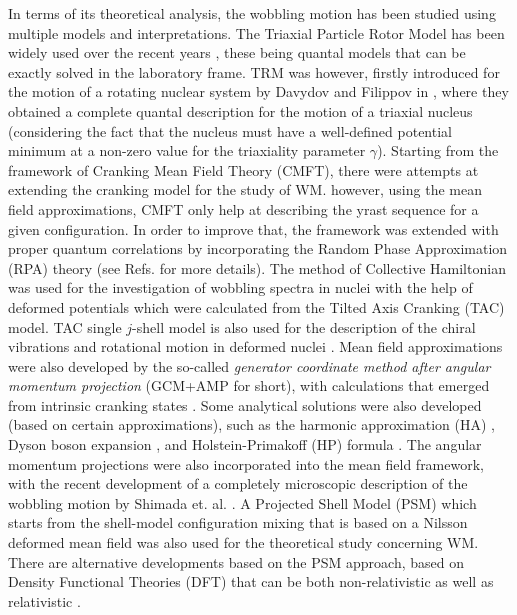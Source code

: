 \documentclass[11pt]{article}
\begin{document}
In terms of its theoretical analysis, the wobbling motion has been studied using multiple models and interpretations. The Triaxial Particle Rotor Model has been widely used over the recent years \cite{bohr1998nuclear,hamamoto2002wobbling,frauendorf2014transverse,tanabe2006algebraic,wen2015wobbling}, these being quantal models that can be exactly solved in the laboratory frame. TRM was however, firstly introduced for the motion of a rotating nuclear system by Davydov and Filippov in \cite{davydov1958rotational}, where they obtained a complete quantal description for the motion of a triaxial nucleus (considering the fact that the nucleus must have a well-defined potential minimum at a non-zero value for the triaxiality parameter $\gamma$). Starting from the framework of Cranking Mean Field Theory (CMFT), there were attempts at extending the cranking model for the study of WM. however, using the mean field approximations, CMFT only help at describing the yrast sequence for a given configuration. In order to improve that, the framework was extended with proper quantum correlations by incorporating the Random Phase Approximation (RPA) theory (see Refs. \cite{shimizu1995nuclear,matsuzaki2002wobbling,matsuzaki2003dynamical,matsuzaki2004instability,matsuzaki2004nuclear,shimizu2005high,shimizu2008parametrizations,shoji2009microscopic} for more details).  The method of Collective Hamiltonian \cite{chen2014collective,chen2016wobbling} was used for the investigation of wobbling spectra in nuclei with the help of deformed potentials which were calculated from the Tilted Axis Cranking (TAC) model. TAC single $j$-shell model is also used for the description of the chiral vibrations and rotational motion in deformed nuclei \cite{mukhopadhyay2007chiral,qi2009chirality}. Mean field approximations were also developed by the so-called \emph{generator coordinate method after angular momentum projection} (GCM+AMP for short), with calculations that emerged from intrinsic cranking states \cite{oi2000wobbling}. Some analytical solutions were also developed (based on certain approximations), such as the harmonic approximation (HA) \cite{bohr1998nuclear,frauendorf2014transverse,chen2014collective,raduta2017semiclassical}, Dyson boson expansion \cite{raduta2017semiclassical,raduta2020new}, and Holstein-Primakoff (HP) formula \cite{tanabe1971triaxiality,tanabe2006algebraic,tanabe2008selection,raduta2017semiclassical,raduta2020new}. The angular momentum projections were also incorporated into the mean field framework, with the recent development of a completely microscopic description of the wobbling motion by Shimada et. al. \cite{shimada2018rotational}. A Projected Shell Model (PSM) \cite{hara1995projected} which starts from the shell-model configuration mixing that is based on a Nilsson deformed mean field was also used for the theoretical study concerning WM. There are alternative developments based on the PSM approach, based on Density Functional Theories (DFT) that can be both non-relativistic \cite{zhao2016configuration} as well as relativistic \cite{konieczka2018gamow}.
\end{document}
